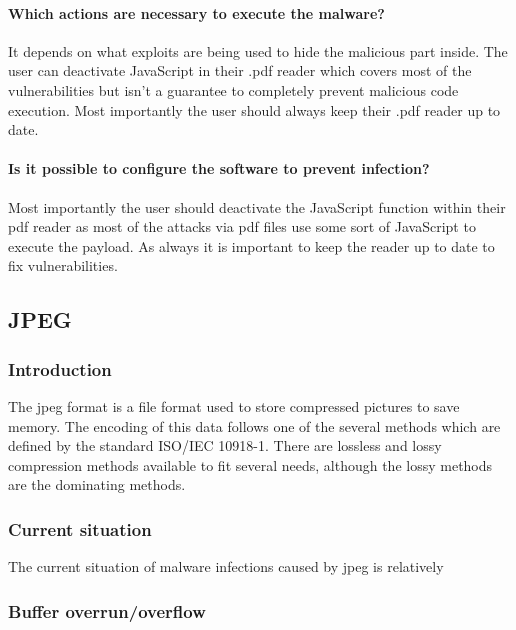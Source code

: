 \documentclass[a4paper,10pt]{article}
\begin{document}
\paragraph{Which actions are necessary to execute the malware?}
It depends on what exploits are being used to hide the malicious part inside. The user can deactivate JavaScript in their .pdf reader which covers most of the vulnerabilities but isn't a guarantee to completely prevent malicious code execution. Most importantly the user should always keep their .pdf reader up to date.
\paragraph*{Is it possible to configure the software to prevent infection?}
Most importantly the user should deactivate the JavaScript function within their pdf reader as most of the attacks via pdf files use some sort of JavaScript to execute the payload. As always it is important to keep the reader up to date to fix vulnerabilities.


\subsection{JPEG}
\subsubsection{Introduction}
The jpeg format is a file format used to store compressed pictures to save memory. The encoding of this data follows one of the several methods which are defined by the standard ISO/IEC 10918-1. There are lossless and lossy compression methods available to fit several needs, although the lossy methods are the dominating methods.

\subsubsection{Current situation}

The current situation of malware infections caused by jpeg is relatively 


\subsubsection{Buffer overrun/overflow}
\end{document}
